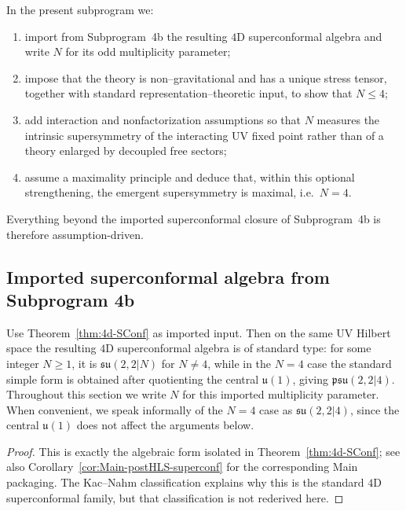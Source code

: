 In the present subprogram we:

\begin{enumerate}[(1)]
  \item import from Subprogram~4b the resulting \(4\)D superconformal
        algebra and write \(N\) for its odd multiplicity parameter;

  \item impose that the theory is non–gravitational and has a unique
        stress tensor, together with standard representation–theoretic
        input, to show that \(N\le 4\);

  \item add interaction and nonfactorization assumptions so that \(N\)
        measures the intrinsic supersymmetry of the interacting UV fixed
        point rather than of a theory enlarged by decoupled free
        sectors;

  \item assume a maximality principle and deduce that, within this
        optional strengthening, the emergent supersymmetry is maximal,
        i.e.\ \(N=4\).
\end{enumerate}

Everything beyond the imported superconformal closure of
Subprogram~4b is therefore assumption-driven.

\subsection{Imported superconformal algebra from Subprogram 4b}
\label{subsec:4c-algebraic}

\begin{proposition}
\label{prop:4c-su-22N}
Use Theorem~\ref{thm:4d-SConf} as imported input. Then on the same UV
Hilbert space the resulting \(4\)D superconformal algebra is of standard
type: for some integer \(N\ge1\), it is
\(\mathfrak{su}(2,2|N)\) for \(N\neq4\), while in the \(N=4\) case the
standard simple form is obtained after quotienting the central
\(\mathfrak u(1)\), giving \(\mathfrak{psu}(2,2|4)\). Throughout this
section we write \(N\) for this imported multiplicity parameter. When
convenient, we speak informally of the \(N=4\) case as
\(\mathfrak{su}(2,2|4)\), since the central \(\mathfrak u(1)\) does not
affect the arguments below.
\end{proposition}

\begin{proof}
This is exactly the algebraic form isolated in
Theorem~\ref{thm:4d-SConf}; see also
Corollary~\ref{cor:Main-postHLS-superconf} for the corresponding Main
packaging. The Kac--Nahm classification explains why this is the
standard \(4\)D superconformal family, but that classification is not
rederived here.
\end{proof}

